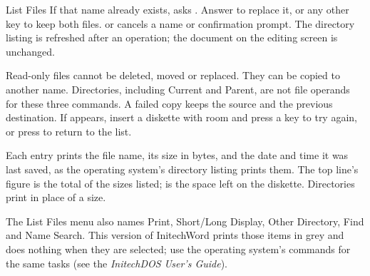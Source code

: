 \begin{Feature}{List Files}
If that name already exists,  asks .  Answer
 to replace it, or any other key to keep both files.  
or  cancels a name or confirmation prompt.  The directory listing
is refreshed after an operation; the document on the editing screen is
unchanged.

Read-only files cannot be deleted, moved or replaced.  They can be copied
to another name.  Directories, including Current and Parent, are not file
operands for these three commands.  A failed copy keeps the source and
the previous destination.  If  appears, insert
a diskette with room and press a key to try again, or press
 to return to the list.

Each entry prints the file name, its size in bytes, and the date and time it
was last saved, as the operating system's directory listing prints them.  The
top line's  figure is the total of the sizes listed;  is
the space left on the diskette.  Directories print  in place of
a size.

The List Files menu also names Print, Short/Long
Display, Other Directory, Find and Name Search.  This version of
InitechWord prints those items in grey and does nothing when they are
selected; use the operating system's commands for the same tasks (see the
\emph{InitechDOS User's Guide}).

\end{Feature}


